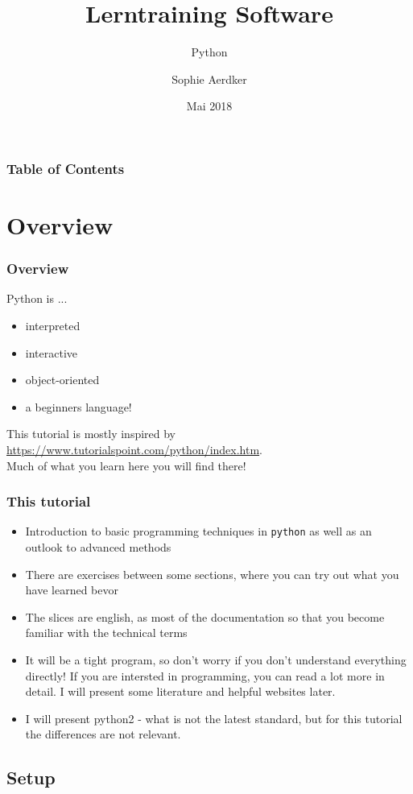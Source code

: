 \documentclass{beamer}
\title{Lerntraining Software}
\subtitle{Python}
\author{Sophie Aerdker}
\institute{Ruhr-Universit\"at Bochum}
\date{Mai 2018}
\begin{document}
 
\frame{\titlepage}
\begin{frame}
\frametitle{Table of Contents}
	\begin{multicols}{2}
 		 \tableofcontents
	\end{multicols}
\end{frame}

\section{Overview}

\begin{frame}
\frametitle{Overview}
	Python is ...\\
	\begin{itemize}
		\item interpreted
		\item interactive 
		\item object-oriented 
		\item a beginners language!
	\end{itemize}
	
	This tutorial is mostly inspired by \url{https://www.tutorialspoint.com/python/index.htm}. \\ Much of what you learn here you will find there!
\end{frame}

\begin{frame}
\frametitle{This tutorial}
	\begin{itemize}
		\item Introduction to basic programming techniques in \texttt{python} as well as an outlook to advanced methods
		\item There are exercises between some sections, where you can try out what you have learned bevor
		\item The slices are english, as most of the documentation so that you become familiar with the technical terms
		\item It will be a tight program, so don't worry if you don't understand everything directly! If you are intersted in programming, you can read a lot more in detail. I will present some literature and helpful websites later. 
		\item I will present python2 - what is not the latest standard, but for this tutorial the differences are not relevant.
	\end{itemize}
\end{frame}



\subsection{Setup}
\end{document}
